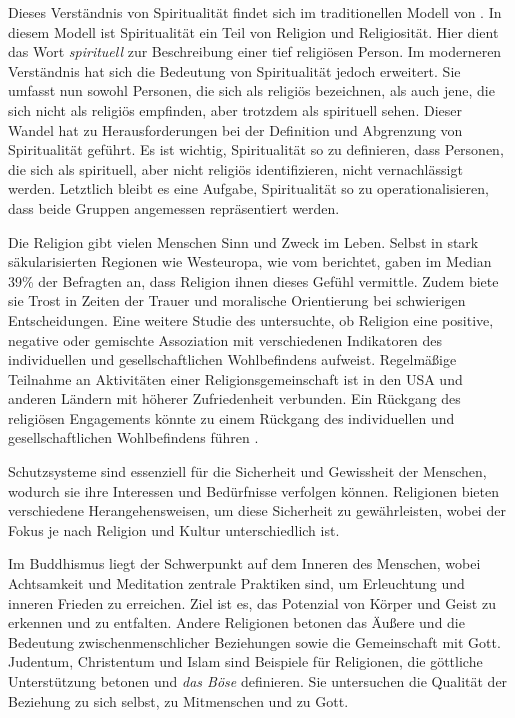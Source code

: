 Dieses Verständnis von Spiritualität findet sich im traditionellen Modell von \textcite{ReliSpiriModell}. In diesem Modell ist Spiritualität ein Teil von Religion und Religiosität. Hier dient das Wort \textit{spirituell} zur Beschreibung einer tief religiösen Person. Im moderneren Verständnis hat sich die Bedeutung von Spiritualität jedoch erweitert. Sie umfasst nun sowohl Personen, die sich als religiös bezeichnen, als auch jene, die sich nicht als religiös empfinden, aber trotzdem als spirituell sehen.
Dieser Wandel hat zu Herausforderungen bei der Definition und Abgrenzung von Spiritualität geführt. Es ist wichtig, Spiritualität so zu definieren, dass Personen, die sich als spirituell, aber nicht religiös identifizieren, nicht vernachlässigt werden. Letztlich bleibt es eine Aufgabe, Spiritualität so zu operationalisieren, dass beide Gruppen angemessen repräsentiert werden.

Die Religion gibt vielen Menschen Sinn und Zweck im Leben. Selbst in stark säkularisierten Regionen wie Westeuropa, wie vom \textcite{PRC} berichtet, gaben im Median 39\% der Befragten an, dass Religion ihnen dieses Gefühl vermittle. Zudem biete sie Trost in Zeiten der Trauer und moralische Orientierung bei schwierigen Entscheidungen. 
Eine weitere Studie des \textcite{PRC2} untersuchte, ob Religion eine positive, negative oder gemischte Assoziation mit verschiedenen Indikatoren des individuellen und gesellschaftlichen Wohlbefindens aufweist. Regelmäßige Teilnahme an Aktivitäten einer Religionsgemeinschaft ist in den USA und anderen Ländern mit höherer Zufriedenheit verbunden. Ein Rückgang des religiösen Engagements könnte zu einem Rückgang des individuellen und gesellschaftlichen Wohlbefindens führen \parencite{PRC2}.

Schutzsysteme sind essenziell für die Sicherheit und Gewissheit der Menschen, wodurch sie ihre Interessen und Bedürfnisse verfolgen können. Religionen bieten verschiedene Herangehensweisen, um diese Sicherheit zu gewährleisten, wobei der Fokus je nach Religion und Kultur unterschiedlich ist.

Im Buddhismus liegt der Schwerpunkt auf dem Inneren des Menschen, wobei Achtsamkeit und Meditation zentrale Praktiken sind, um Erleuchtung und inneren Frieden zu erreichen. Ziel ist es, das Potenzial von Körper und Geist zu erkennen und zu entfalten.
Andere Religionen betonen das Äußere und die Bedeutung zwischenmenschlicher Beziehungen sowie die Gemeinschaft mit Gott. Judentum, Christentum und Islam sind Beispiele für Religionen, die göttliche Unterstützung betonen und \textit{das Böse} definieren. Sie untersuchen die Qualität der Beziehung zu sich selbst, zu Mitmenschen und zu Gott.

